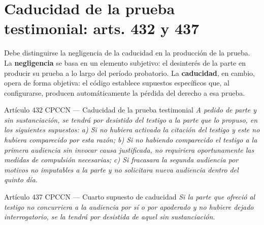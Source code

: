 \documentclass[12pt,oneside]{book}
\begin{document}
\section{Caducidad de la prueba testimonial: arts. 432 y 437}

Debe distinguirse la negligencia de la caducidad en la producción de la prueba. La \textbf{negligencia} se basa en un elemento subjetivo: el desinterés de la parte en producir su prueba a lo largo del período probatorio. La \textbf{caducidad}, en cambio, opera de forma objetiva: el código establece supuestos específicos que, al configurarse, producen automáticamente la pérdida del derecho a esa prueba.

\begin{norma}{Artículo 432 CPCCN --- Caducidad de la prueba testimonial}
\textit{A pedido de parte y sin sustanciación, se tendrá por desistido del testigo a la parte que lo propuso, en los siguientes supuestos: a) Si no hubiera activado la citación del testigo y este no hubiera comparecido por esta razón; b) Si no habiendo comparecido el testigo a la primera audiencia sin invocar causa justificada, no requiriera oportunamente las medidas de compulsión necesarias; c) Si fracasara la segunda audiencia por motivos no imputables a la parte y no solicitara nueva audiencia dentro del quinto día.}
\end{norma}

\begin{norma}{Artículo 437 CPCCN --- Cuarto supuesto de caducidad}
\textit{Si la parte que ofreció al testigo no concurriera a la audiencia por sí o por apoderado y no hubiere dejado interrogatorio, se la tendrá por desistida de aquel sin sustanciación.}
\end{norma}
\end{document}
